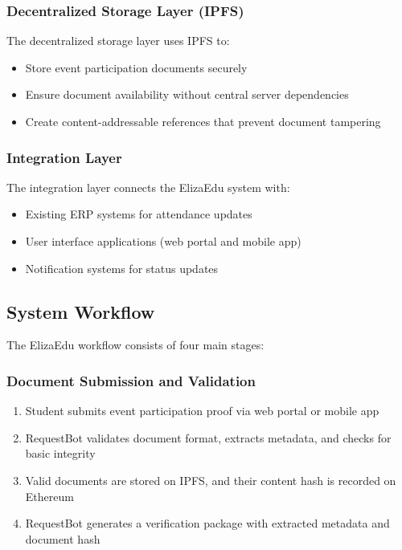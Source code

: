 \documentclass[a4paper,12pt]{article}
\begin{document}
\subsubsection{Decentralized Storage Layer (IPFS)}
The decentralized storage layer uses IPFS to:
\begin{itemize}
    \item Store event participation documents securely
    \item Ensure document availability without central server dependencies
    \item Create content-addressable references that prevent document tampering
\end{itemize}

\subsubsection{Integration Layer}
The integration layer connects the ElizaEdu system with:
\begin{itemize}
    \item Existing ERP systems for attendance updates
    \item User interface applications (web portal and mobile app)
    \item Notification systems for status updates
\end{itemize}

\subsection{System Workflow}
The ElizaEdu workflow consists of four main stages:

\subsubsection{Document Submission and Validation}
\begin{enumerate}
    \item Student submits event participation proof via web portal or mobile app
    \item RequestBot validates document format, extracts metadata, and checks for basic integrity
    \item Valid documents are stored on IPFS, and their content hash is recorded on Ethereum
    \item RequestBot generates a verification package with extracted metadata and document hash
\end{enumerate}
\end{document}
